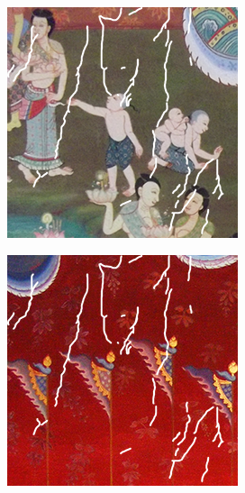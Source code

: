 \documentclass[xcolor=dvipsnames, xetex,serif]{beamer}
\begin{document}
\begin{frame}
\begin{figure}[H]
\begin{subfigure}{0.15\linewidth}
            \end{subfigure}
            \begin{subfigure}{0.15\linewidth}
                \centering
                \includegraphics[width=0.9\linewidth]{images/thaiart/case02-toinpaint.png}
            \end{subfigure}
            \begin{subfigure}{0.15\linewidth}
                \centering
                \includegraphics[width=0.9\linewidth]{images/thaiart/case03-toinpaint.png}			

\end{subfigure}
\end{figure}
\end{frame}
\end{document}
